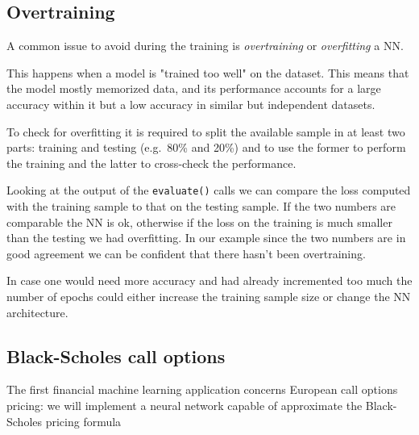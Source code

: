 \subsection{Overtraining}
A common issue to avoid during the training is \emph{overtraining} or \emph{overfitting} a NN. 

This happens when a model is "trained too well" on the dataset. This means that the model mostly memorized data, and its performance accounts for a large accuracy within it but a low accuracy in similar but independent datasets. 

To check for overfitting it is required to split the available sample in at least two parts: training and testing (e.g.~80\% and 20\%) and to use the former to perform the training and the latter to cross-check the performance.


Looking at the output of the \texttt{evaluate()} calls we can compare the loss computed with the training sample to that on the testing sample. If the two numbers are comparable the NN is ok, otherwise if the loss on the training is much smaller than the testing we had overfitting.
In our example since the two numbers are in good agreement we can be confident that there hasn't been overtraining.

In case one would need more accuracy and had already incremented too much the number of epochs could either increase the training sample size or change the NN architecture.

\subsection{Black-Scholes call options}
\label{black-scholes-call-options}

The first financial machine learning application concerns European call options pricing: we will implement a neural network capable of approximate the Black-Scholes pricing formula

